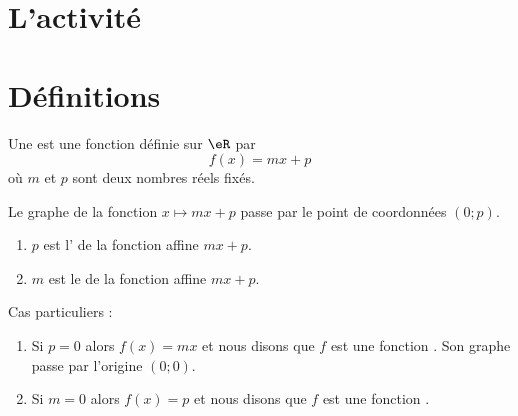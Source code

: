 \section{L'activité}



\section{Définitions}

\begin{definition}
    Une  est une fonction définie sur \( \eR\) par
    \begin{equation}
        f(x)=mx+p
    \end{equation}
    où \( m\) et \( p\) sont deux nombres réels fixés.
\end{definition}

\begin{Aretenir}
    Le graphe de la fonction \( x\mapsto mx+p\) passe par le point de coordonnées \( (0;p)\).
    \begin{enumerate}
        \item
            \( p\) est l' de la fonction affine \( mx+p\).
        \item
            \( m\) est le  de la fonction affine \( mx+p\).
    \end{enumerate}
\end{Aretenir}

Cas particuliers :
\begin{enumerate}
    \item
        Si \( p=0\) alors \( f(x)=mx\) et nous disons que \( f\) est une fonction . Son graphe passe par l'origine \( (0;0)\).
    \item
        Si \( m=0\) alors \( f(x)=p\) et nous disons que \( f\) est une fonction .
\end{enumerate}

